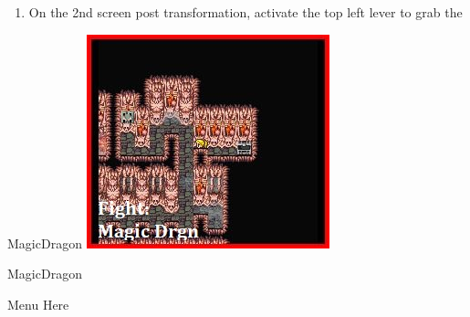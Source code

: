 \begin{paracol}{2}
\switchcolumnTwice[*]
\begin{enumerate}[resume]
    \item On the 2nd screen post transformation, activate the top left lever to grab the 
\end{enumerate}

\switchcolumn
\begin{steproute}{MagicDragon}
    \includegraphics[scale=0.452]{../Graphics/Steps/160. Exdeath's Castle Enc 1.jpg}
\end{steproute}

\switchcolumn
\begin{encounter}{MagicDragon}
	\varwb
	\begin{notes}
		\item {}
	\end{notes}
	\begin{round}{1}
		\cara \leftCommand{\throw} \then \thunderScroll
        \bartz \rightCommand{\gilToss}
        \item {}
        \faris \leftCommand{\catch}
	\end{round}
	\varwe
\end{encounter}

\switchcolumn
\begin{misc}{Menu Here}
\end{misc}


\end{paracol}
